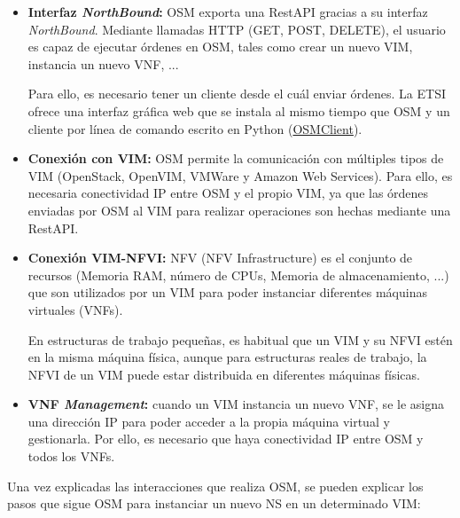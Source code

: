 \begin{itemize}
	\item \textbf{Interfaz \textit{NorthBound}:} OSM exporta una RestAPI gracias a su interfaz \textit{NorthBound}. Mediante llamadas HTTP (GET, POST, DELETE), el usuario es capaz de ejecutar órdenes en OSM, tales como crear un nuevo VIM, instancia un nuevo VNF, ... 
	
	Para ello, es necesario tener un cliente desde el cuál enviar órdenes. La ETSI ofrece una interfaz gráfica web que se instala al mismo tiempo que OSM y un cliente por línea de comando escrito en Python (\href{https://osm.etsi.org/wikipub/index.php/OsmClient}{OSMClient}).
	
	\item \textbf{Conexión con VIM:} OSM permite la comunicación con múltiples tipos de VIM (OpenStack, OpenVIM, VMWare y Amazon Web Services). Para ello, es necesaria conectividad IP entre OSM y el propio VIM, ya que las órdenes enviadas por OSM al VIM para realizar operaciones son hechas mediante una RestAPI.
	
	\item \textbf{Conexión VIM-NFVI:} NFV (NFV Infrastructure) es el conjunto de recursos (Memoria RAM, número de CPUs, Memoria de almacenamiento, ...) que son utilizados por un VIM para poder instanciar diferentes máquinas virtuales (VNFs). 
	
	En estructuras de trabajo pequeñas, es habitual que un VIM y su NFVI estén en la misma máquina física, aunque para estructuras reales de trabajo, la NFVI de un VIM puede estar distribuida en diferentes máquinas físicas.
	
	\item \textbf{VNF \textit{Management}:} cuando un VIM instancia un nuevo VNF, se le asigna una dirección IP para poder acceder a la propia máquina virtual y gestionarla. Por ello, es necesario que haya conectividad IP entre OSM y todos los VNFs. 
\end{itemize}

Una vez explicadas las interacciones que realiza OSM, se pueden explicar los pasos que sigue OSM para instanciar un nuevo NS en un determinado VIM:

